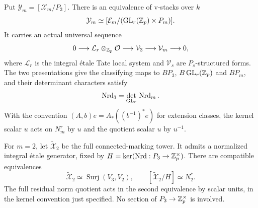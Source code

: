 \begin{proposition}\label{h3:prop:integral-frames}
Put $\mathcal Y_m=[\mathcal X_m/P_3]$.  There is an equivalence
of v-stacks over $k$
\begin{equation}\label{h3:geom:frame-stack}
 \mathcal Y_m\simeq
 [\mathcal E_m/(\operatorname{GL}_r(\mathbb Z_p)\times P_m)].
\end{equation}
It carries an actual universal sequence
\begin{equation}\label{h3:geom:universal-sequence}
 0\longrightarrow\mathcal L_r\otimes_{\mathbb Z_p}\mathcal O
 \longrightarrow\mathcal V_3
 \longrightarrow\mathcal V_m\longrightarrow0,
\end{equation}
where $\mathcal L_r$ is the integral \'etale Tate local system and
$\mathcal V_s$ are $P_s$-structured forms.  The two presentations
give the classifying maps to $BP_3$, $B\operatorname{GL}_r(\mathbb Z_p)$ and $BP_m$,
and their determinant characters satisfy
\begin{equation}\label{h3:geom:determinant-product}
 \operatorname{Nrd}_3=\det_{\operatorname{GL}_r}\,\operatorname{Nrd}_m.
\end{equation}
With the convention $(A,b)e=A_*((b^{-1})^*e)$ for extension classes,
the kernel scalar $u$ acts on $N_m^r$ by $u$ and the quotient scalar
$u$ by $u^{-1}$.

For $m=2$, let $\widetilde{\mathcal X}_2$ be the full
connected-marking tower.  It admits a normalized integral
\'etale generator, fixed by $H=\ker(\operatorname{Nrd}:P_3\to\mathbb Z_p^\times)$.
There are compatible equivalences
\begin{equation}\label{h3:geom:normalized-tower}
 \widetilde{\mathcal X}_2\simeq\operatorname{Surj}(V_3,V_2),
 \qquad [\widetilde{\mathcal X}_2/H]\simeq N_2^*.
\end{equation}
The full residual norm quotient acts in the second equivalence by
scalar units, in the kernel convention just specified.  No section
of $P_3\to\mathbb Z_p^\times$ is involved.
\end{proposition}

